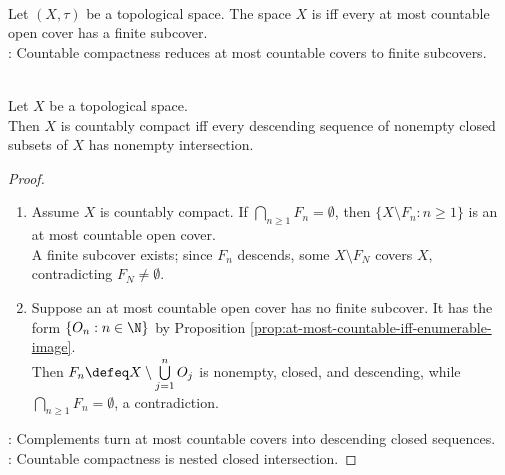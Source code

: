 \begin{definition} \label{def:countably-compact-space} \\
Let $(X,\tau)$ be a topological space. The space $X$ is  iff every at most countable open cover has a finite subcover.\\
: Countable compactness reduces at most countable covers to finite subcovers.
\end{definition}

\begin{proposition} \label{prop:countably-compact-frechet-intersection} \\
Let $X$ be a topological space.\\
Then $X$ is countably compact iff every descending sequence of nonempty closed subsets of $X$ has nonempty intersection.
\begin{proof}
\begin{enumerate}[label=\roman*.]
\setlength{\itemsep}{0pt}
\item[$(\Rightarrow)$] Assume $X$ is countably compact. If $\bigcap\limits_{n\geq1}F_n=\emptyset$, then $\{X\setminus F_n:n\geq1\}$ is an at most countable open cover.\\
A finite subcover exists; since $F_n$ descends, some $X\setminus F_N$ covers $X$, contradicting $F_N\neq\emptyset$.
\item[$(\Leftarrow)$] Suppose an at most countable open cover has no finite subcover. It has the form $\{O_n:n\in\N\}$ by Proposition \ref{prop:at-most-countable-iff-enumerable-image}.\\
Then $F_n\defeq X\setminus\bigcup\limits_{j=1}^n O_j$ is nonempty, closed, and descending, while $\bigcap\limits_{n\geq1}F_n=\emptyset$, a contradiction.
\end{enumerate}
: Complements turn at most countable covers into descending closed sequences.\\
: Countable compactness is nested closed intersection.
\end{proof}
\end{proposition}

